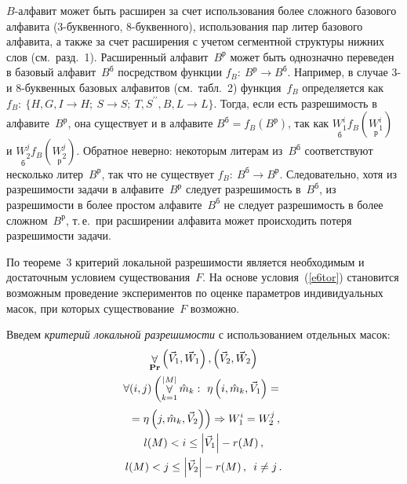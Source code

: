 \begin{multicols}{2}
$B$-алфавит может быть расширен за счет использования более сложного 
базового алфавита (3-бук\-вен\-но\-го, 8-бук\-вен\-но\-го), использования пар 
литер базового алфавита, а также за счет расширения с учетом сегментной  
структуры нижних слов (см.\ разд.~1). Расширенный 
алфавит~$B^{\mathrm{р}}$ может быть однозначно переведен в базовый 
алфавит~$B^{\mathrm{б}}$ посредством функции $f_B:\ 
B^{\mathrm{р}}\rightarrow B^{\mathrm{б}}$. Например, в случае 3- и 
8-бук\-вен\-ных базовых алфавитов (см.\ табл.~2) функция~$f_B$ 
определяется как $f_B:\ \{H,G,I\rightarrow H;\ S\rightarrow S;\ 
T,S^{\prime\prime},B,L\rightarrow L\}$. Тогда, если есть разрешимость в 
алфавите~$B^{\mathrm{р}}$, она существует и в алфавите $B^{\mathrm{б}} 
=f_B(B^{\mathrm{р}})$, так как $\underset{\mathrm{б}}{W_1^i} 
f_B(\underset{\mathrm{р}}{W_1^i})$ и $\underset{\mathrm{б}}{W_2^j} 
f_B(\underset{\mathrm{р}}{W_2^j})$. Обратное неверно: некоторым литерам 
из~$B^{\mathrm{б}}$ соответствуют несколько литер~$B^{\mathrm{р}}$, так 
что не существует $f_B:\ B^{\mathrm{б}}\rightarrow B^{\mathrm{р}}$. 
Следовательно, хотя из разрешимости задачи в алфавите~$B^{\mathrm{р}}$ 
следует разрешимость в~$B^{\mathrm{б}}$, из разрешимости в более прос\-том 
алфавите~$B^{\mathrm{б}}$ не следует разрешимость в более 
сложном~$B^{\mathrm{р}}$, т.\,е.\ при расширении алфавита может 
происходить потеря раз\-ре\-ши\-мости за\-дачи.

    По теореме~3 критерий локальной раз\-ре\-ши\-мости является необходимым 
и достаточным условием существования~$F$. На основе условия~(\ref{e6tor}) 
становится возможным проведение экспериментов по оценке параметров 
индивидуальных масок, при которых существование~$F$ воз\-можно. 

    Введем \textit{критерий локальной разрешимости} с использованием 
отдельных масок:
\setcounter{equation}{3}\renewcommand{\theequation}{\arabic{equation}$^{\prime\prime}$}
\begin{multline*}
\forallb\limits_{\mathbf{Pr}} \left(\vec{V}_1,\vec{W}_1\right), \left( \vec{V}_2, 
\vec{W}_2\right)\\ \forall (i,j) \left( \forallb\limits_{k=1}^{\vert M\vert} \hat{m}_k:\ 
\eta \left(i,\hat{m}_k, \vec{V}_1\right) ={}\right.
\end{multline*}
\begin{multline}
\left.{}=
\eta\left(j,\hat{m}_k,\vec{V}_2\right)\right) 
\Rightarrow W_1^i=W_2^j\,,
\\
l(M)<i\leq \left|\vec{V}_1\right| -r(M)\,,\\ l(M)<j\leq \left|\vec{V}_2\right|-
r(M)\,,\enskip
 i\not=j\,.
\end{multline}


\end{multicols}
